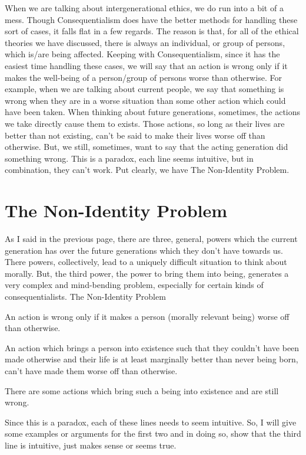 
When we are talking about intergenerational ethics, we do run into a bit of a mess. Though Consequentialism does have the better methods for handling these sort of cases, it falls flat in a few regards. The reason is that, for all of the ethical theories we have discussed, there is always an individual, or group of persons, which is/are being affected. Keeping with Consequentialism, since it has the easiest time handling these cases, we will say that an action is wrong only if it makes the well-being of a person/group of persons worse than otherwise. For example, when we are talking about current people, we say that something is wrong when they are in a worse situation than some other action which could have been taken. When thinking about future generations, sometimes, the actions we take directly cause them to exists. Those actions, so long as their lives are better than not existing, can't be said to make their lives worse off than otherwise. But, we still, sometimes, want to say that the acting generation did something wrong. This is a paradox, each line seems intuitive, but in combination, they can't work. Put clearly, we have The Non-Identity Problem.
\section{The Non-Identity Problem}
As I said in the previous page, there are three, general, powers which the current generation has over the future generations which they don't have towards us. There powers, collectively, lead to a uniquely difficult situation to think about morally. But, the third power, the power to bring them into being, generates a very complex and mind-bending problem, especially for certain kinds of consequentialists. 
The Non-Identity Problem
\begin{earg}
    \item[] An action is wrong only if it makes a person (morally relevant being) worse off than otherwise.
    \item[] An action which brings a person into existence such that they couldn’t have been made otherwise and their life is at least marginally better than never being born, can’t have made them worse off than otherwise.
    \item[] There are some actions which bring such a being into existence and are still wrong.
\end{earg}
Since this is a paradox, each of these lines needs to seem intuitive. So, I will give some examples or arguments for the first two and in doing so, show that the third line is intuitive, just makes sense or seems true. 
